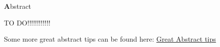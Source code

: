 
\clearemptydoublepage
{}
{}

\vspace*{2cm}
\begin{center}
{\Large \textbf Abstract}
\end{center}
\vspace{1cm}

TO DO!!!!!!!!!!!!

Some more great abstract tips can be found here: 
\href{https://users.ece.cmu.edu/~koopman/essays/abstract.html}{Great Abstract tips}
